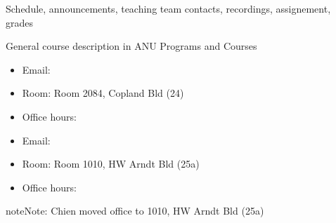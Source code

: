 \documentclass[letterpaper,10pt,english]{jupyterBook}
\begin{document}
\begin{DUlineblock}{0em}
\item[] 
\end{DUlineblock}

\sphinxAtStartPar
{}
Schedule, announcements, teaching team contacts, recordings, assignement, grades

\sphinxAtStartPar
{}
General course description in ANU Programs and Courses

\begin{DUlineblock}{0em}
\item[] 
\end{DUlineblock}

\sphinxAtStartPar
{}
\begin{itemize}
\item {} 
\sphinxAtStartPar
Email: 

\item {} 
\sphinxAtStartPar
Room: Room 2084, Copland Bld (24)

\item {} 
\sphinxAtStartPar
Office hours: 

\end{itemize}

\sphinxAtStartPar
{}
\begin{itemize}
\item {} 
\sphinxAtStartPar
Email: 

\item {} 
\sphinxAtStartPar
Room: Room 1010, HW Arndt Bld (25a)

\item {} 
\sphinxAtStartPar
Office hours: 

\end{itemize}

\begin{sphinxadmonition}{note}{Note:}
\sphinxAtStartPar
Chien moved office to 1010, HW Arndt Bld (25a)
\end{sphinxadmonition}
\end{document}
